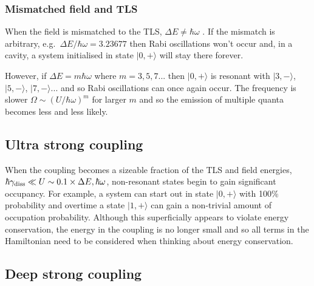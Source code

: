 \documentclass[
]{article}
\renewcommand{\[}{\begin{equation}}
\renewcommand{\]}{\end{equation}}
\begin{document}
\subsubsection{Mismatched field and TLS}\label{mismatched-field-and-tls}

When the field is mismatched to the TLS, \(\Delta E \neq \hbar\omega\) .
If the mismatch is arbitrary, e.g.~\(\Delta E/ \hbar\omega = 3.23677\)
then Rabi oscillations won't occur and, in a cavity, a system
initialised in state \(|0,+\rangle\) will stay there forever.

However, if \(\Delta E = m \hbar\omega\) where \(m=3, 5, 7 ...\) then
\(|0,+\rangle\) is resonant with \(|3,-\rangle\), \(|5,-\rangle\),
\(|7,-\rangle ...\) and so Rabi oscillations can once again occur. The
frequency is slower \(\Omega \sim (U/\hbar\omega)^m\) for larger \(m\)
and so the emission of multiple quanta becomes less and less likely.

\subsection{Ultra strong coupling}\label{ultra-strong-coupling-1}

When the coupling becomes a sizeable fraction of the TLS and field
energies,
\(\hbar\gamma_{\rm diss} \ll U \sim 0.1 \times \Delta E , \hbar \omega\),
non-resonant states begin to gain significant occupancy. For example, a
system can start out in state \(|0,+\rangle\) with 100\% probability and
overtime a state \(|1,+\rangle\) can gain a non-trivial amount of
occupation probability. Although this superficially appears to violate
energy conservation, the energy in the coupling is no longer small and
so all terms in the Hamiltonian need to be considered when thinking
about energy conservation.

\subsection{Deep strong coupling}\label{deep-strong-coupling-1}

\printbibliography
\end{document}
